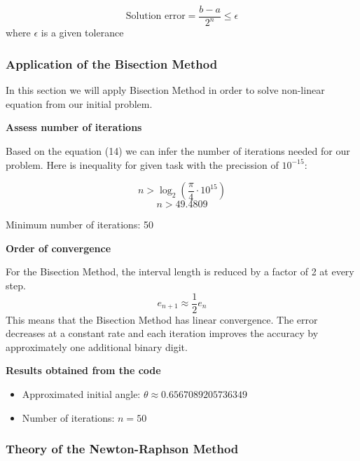 \documentclass{article}
\begin{document}
\begin{equation}
    \text{Solution error} = \frac{b - a}{2^n} \leq \epsilon
\end{equation}
where $\epsilon$ is a given tolerance

\subsubsection{Application of the Bisection Method}

In this section we will apply Bisection Method in order to solve non-linear equation from our initial problem.

\vspace{5pt}
\noindent \textbf{Assess number of iterations}

Based on the equation (14) we can infer the number of iterations needed for our problem. Here is inequality for given task with the precission of $10^{-15}$:

\begin{equation*}
    n > \log_{2}\!\left(\frac{\pi}{4} \cdot 10^{15}\right)
\end{equation*}
\begin{equation*}
    n > 49.4809
\end{equation*}

Minimum number of iterations: 50

\vspace{5pt}
\noindent \textbf{Order of convergence}

For the Bisection Method, the interval length is reduced by a factor of 2 at every step.
\begin{equation*}
    e_{n+1} \approx \frac{1}{2} e_n
\end{equation*}
This means that the Bisection Method has linear convergence. The error decreases at a constant rate and each iteration improves the accuracy by approximately one additional binary digit.

\vspace{5pt}
\noindent \textbf{Results obtained from the code}
\begin{itemize}
    \item Approximated initial angle: $\theta \approx 0.6567089205736349$
    \item Number of iterations: $n = 50$
\end{itemize}

\subsubsection{Theory of the Newton-Raphson Method} 
\end{document}
